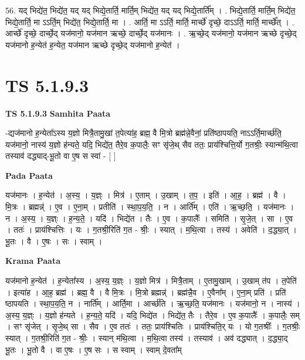 \documentclass[17pt]{extarticle}
\begin{document}
56. यद् भिद्ये॑त॒ भिद्ये॑त॒ यद् यद् भिद्ये॒तार्ति॒ मार्ति॒म् भिद्ये॑त॒ यद् यद् भिद्ये॒तार्ति᳚म् । . भिद्ये॒तार्ति॒ मार्ति॒म् भिद्ये॑त॒ भिद्ये॒तार्ति॒ मा ऽऽर्ति॒म् भिद्ये॑त॒ भिद्ये॒तार्ति॒ मा । . आर्ति॒ मा ऽऽर्ति॒ मार्ति॒ मार्च्छे॑ दृच्छे॒ दाऽऽर्ति॒ मार्ति॒ मार्च्छे᳚त् । . आर्च्छे॑ दृच्छे॒ दार्च्छे॒द् यज॑मानो॒ यज॑मान ऋच्छे॒ दार्च्छे॒द् यज॑मानः । . ऋ॒च्छे॒द् यज॑मानो॒ यज॑मान ऋच्छे दृच्छे॒द् यज॑मानो ह॒न्येत॑ ह॒न्येत॒ यज॑मान ऋच्छे दृच्छे॒द् यज॑मानो ह॒न्येत॑ । \newline
\pagebreak
{}

\section{ TS 5.1.9.3 }

\textbf{TS 5.1.9.3 } \newline
\textbf{Samhita Paata} \newline

-द्यज॑मानो ह॒न्येता᳚ऽस्य य॒ज्ञो मित्रै॒तामु॒खां त॒पेत्या॑ह॒ ब्रह्म॒ वै मि॒त्रो ब्रह्म॑न्ने॒वैनां॒ प्रति॑ष्ठापयति॒ नाऽऽर्ति॒मार्च्छ॑ति॒ यज॑मानो॒ नास्य॑ य॒ज्ञो ह॑न्यते॒ यदि॒ भिद्ये॑त॒ तैरे॒व क॒पालैः॒ सꣳ सृ॑जे॒थ् सैव ततः॒ प्राय॑श्चित्ति॒र्यो ग॒तश्रीः॒ स्यान्म॑थि॒त्वा तस्याव॑ दद्ध्याद्-भू॒तो वा ए॒ष स स्वां - [  ] \newline

\textbf{Pada Paata} \newline

यज॑मानः । ह॒न्येत॑ । अ॒स्य॒ । य॒ज्ञ्ः । मित्र॑ । ए॒ताम् । उ॒खाम् । त॒प॒ । इति॑ । आ॒ह॒ । ब्रह्म॑ । वै । मि॒त्रः । ब्रह्मन्न्॑ । ए॒व । ए॒ना॒म् । प्रतीति॑ । स्था॒प॒य॒ति॒ । न । आर्ति᳚म् । एति॑ । ऋ॒च्छ॒ति॒ । यज॑मानः । न । अ॒स्य॒ । य॒ज्ञ्ः । ह॒न्य॒ते॒ । यदि॑ । भिद्ये॑त । तैः । ए॒व । क॒पालैः᳚ । समिति॑ । सृ॒जे॒त् । सा । ए॒व । ततः॑ । प्राय॑श्चित्तिः । यः । ग॒तश्री॒रिति॑ ग॒त - श्रीः॒ । स्यात् । म॒थि॒त्वा । तस्य॑ । अवेति॑ । द॒द्ध्या॒त् । भू॒तः । वै । ए॒षः । सः । स्वाम् ।  \newline


\textbf{Krama Paata} \newline

यज॑मानो ह॒न्येत॑ । ह॒न्येता᳚स्य । अ॒स्य॒ य॒ज्ञ्ः । य॒ज्ञो मित्र॑ । मित्रै॒ताम् । ए॒तामु॒खाम् । उ॒खाम् त॑प । त॒पेति॑ । इत्या॑ह । आ॒ह॒ ब्रह्म॑ । ब्रह्म॒ वै । वै मि॒त्रः । मि॒त्रो ब्रह्मन्न्॑ । ब्रह्म॑न्नै॒व । ए॒वैना᳚म् । ए॒ना॒म् प्रति॑ । प्रति॑ ष्ठापयति । स्था॒प॒य॒ति॒ न । नार्ति᳚म् । आर्ति॒मा । आर्च्छ॑ति । ऋ॒च्छ॒ति॒ यज॑मानः । यज॑मानो॒ न । नास्य॑ । अ॒स्य॒ य॒ज्ञ्ः । य॒ज्ञो ह॑न्यते । ह॒न्य॒ते॒ यदि॑ । यदि॒ भिद्ये॑त । भिद्ये॑त॒ तैः । तैरे॒व । ए॒व क॒पालैः᳚ । क॒पालैः॒ सम् । सꣳ सृ॑जेत् । सृ॒जे॒थ् सा । सैव । ए॒व ततः॑ । ततः॒ प्राय॑श्चितिः । प्राय॑श्चिति॒र् यः । यो ग॒तश्रीः᳚ । ग॒तश्रीः॒ स्यात् । ग॒तश्री॒रिति॑ ग॒त - श्रीः॒ । स्यान् म॑थि॒त्वा । म॒थि॒त्वा तस्य॑ । तस्याव॑ । अव॑ दद्ध्यात् । द॒द्ध्या॒द् भू॒तः । भू॒तो वै । वा ए॒षः । ए॒ष सः । स स्वाम् । स्वाम् दे॒वता᳚म् \newline
\end{document}
